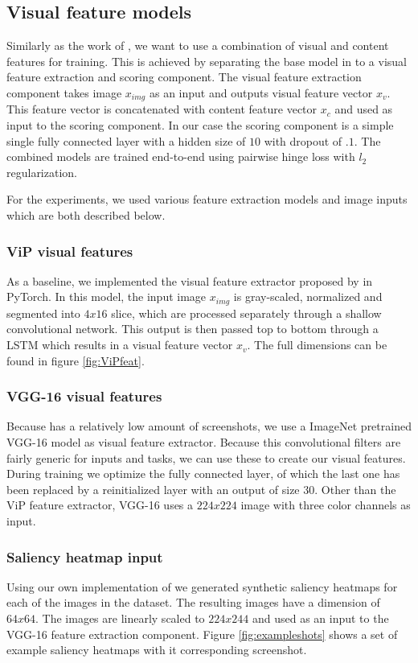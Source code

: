 \subsection{Visual feature models}
Similarly as the work of \citet{fan2017learning}, we want to use a combination of visual and content features for training. This is achieved by separating the base model in to a visual feature extraction and scoring component. The visual feature extraction component takes image $x_{img}$ as an input and outputs visual feature vector $x_{v}$. This feature vector is concatenated with content feature vector $x_{c}$ and used as input to the scoring component. In our case the scoring component is a simple single fully connected layer with a hidden size of $10$ with dropout of $.1$. The combined models are trained end-to-end using pairwise hinge loss with $l_2$ regularization. 

For the experiments, we used various feature extraction models and image inputs which are both described below.


\subsubsection{ViP visual features}
As a baseline, we implemented the visual feature extractor proposed by \citet{fan2017learning} in PyTorch. In this model, the input image $x_{img}$ is gray-scaled, normalized and segmented into $4x16$ slice, which are processed separately through a shallow convolutional network. This output is then passed top to bottom through a LSTM which results in a visual feature vector $x_{v}$. The full dimensions can be found in figure \ref{fig:ViPfeat}.

\subsubsection{VGG-16 visual features}
Because \datasetname has a relatively low amount of screenshots, we use a ImageNet pretrained VGG-16 \cite{simonyan2014very} model as visual feature extractor. Because this convolutional filters are fairly generic for inputs and tasks, we can use these to create our visual features. During training we optimize the fully connected layer, of which the last one has been replaced by a reinitialized layer with an output of size $30$.  Other than the ViP feature extractor, VGG-16 uses a $224x224$ image with three color channels as input. 

\subsubsection{Saliency heatmap input}
Using our own implementation of \citet{shan2017two} we generated synthetic saliency heatmaps for each of the images in the \datasetname dataset. The resulting images have a dimension of $64x64$. The images are linearly scaled to $224x244$ and used as an input to the VGG-16 feature extraction component. Figure \ref{fig:exampleshots} shows a set of example saliency heatmaps with it corresponding screenshot. 

